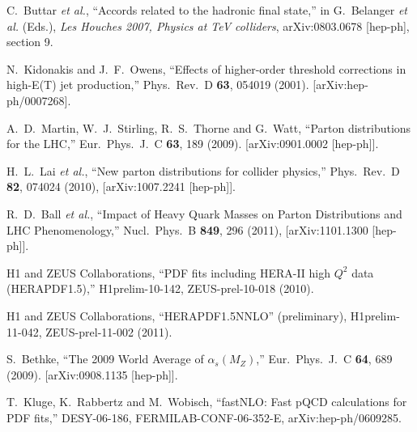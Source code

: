 \documentclass[11pt]{article}
\begin{document}
\begin{thebibliography}{99}



  C.~Buttar {\it et al.},
  ``Accords related to the hadronic final state,''
  in G.~Belanger {\it et al.} (Eds.),
  {\sl Les Houches 2007, Physics at TeV colliders},
  arXiv:0803.0678 [hep-ph],  section 9.


  N.~Kidonakis and J.~F.~Owens,
  ``Effects of higher-order threshold corrections in high-E(T) jet
  production,''
  Phys.\ Rev.\  D {\bf 63}, 054019 (2001).
  [arXiv:hep-ph/0007268].


  A.~D.~Martin, W.~J.~Stirling, R.~S.~Thorne and G.~Watt,
  ``Parton distributions for the LHC,''
  Eur.\ Phys.\ J.\  C {\bf 63}, 189 (2009).
  [arXiv:0901.0002 [hep-ph]].

  H.~L.~Lai {\it et al.},
  ``New parton distributions for collider physics,''
  Phys.\ Rev.\  D {\bf 82}, 074024 (2010),
  [arXiv:1007.2241 [hep-ph]].

  R.~D.~Ball {\it et al.},
  ``Impact of Heavy Quark Masses on Parton Distributions and LHC
  Phenomenology,''
  Nucl.\ Phys.\  B {\bf 849}, 296 (2011),
   [arXiv:1101.1300 [hep-ph]].

  H1 and ZEUS Collaborations, 
  ``PDF fits including HERA-II high $Q^2$ data (HERAPDF1.5),''  
  H1prelim-10-142, ZEUS-prel-10-018 (2010).

  H1 and ZEUS Collaborations, 
  ``HERAPDF1.5NNLO'' (preliminary), 
  H1prelim-11-042, ZEUS-prel-11-002 (2011).


  S.~Bethke,
  ``The 2009 World Average of $\alpha_s (M_Z)$,''
  Eur.\ Phys.\ J.\  C {\bf 64}, 689 (2009).
   [arXiv:0908.1135 [hep-ph]].


  T.~Kluge, K.~Rabbertz and M.~Wobisch,
  ``fastNLO: Fast pQCD calculations for PDF fits,''
  DESY-06-186, FERMILAB-CONF-06-352-E,
  arXiv:hep-ph/0609285.



\end{thebibliography}
\end{document}
